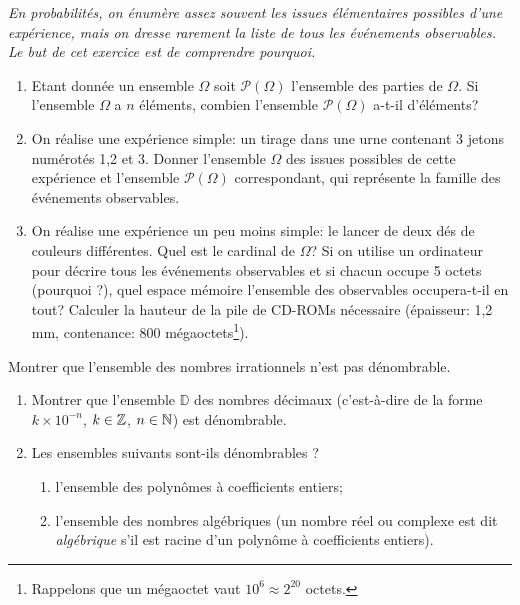 \documentclass[a4paper,12pt,reqno]{amsart}
\begin{document}
\begin{exo} %

  \emph{En probabilités, on énumère assez souvent les issues élémentaires possibles d'une expérience, mais on dresse rarement la liste de tous les événements observables. Le but de cet exercice est de comprendre pourquoi.}

  \begin{enumerate}

    \item Etant donnée un ensemble $\Omega$ soit $\mathcal{P}(\Omega)$ l'ensemble des parties de $\Omega$. Si l'ensemble $\Omega$ a $n$ éléments, combien l'ensemble $\mathcal{P}(\Omega)$ a-t-il d'éléments?

    \item On réalise une expérience simple: un tirage dans une urne contenant 3 jetons numérotés 1,2 et 3.  Donner l'ensemble $\Omega$ des issues possibles de cette expérience et l'ensemble $\mathcal{P}(\Omega)$ correspondant, qui représente la famille des événements observables.

    \item On réalise une expérience un peu moins simple: le lancer de deux dés de couleurs différentes.  Quel est le cardinal de $\Omega$?  Si on utilise un ordinateur pour décrire tous les événements observables et si chacun occupe 5 octets (pourquoi ?), quel espace mémoire l'ensemble des observables occupera-t-il en tout?  Calculer la hauteur de la pile de CD-ROMs nécessaire (épaisseur: 1,2\,mm, contenance: 800 mégaoctets\footnote{Rappelons que un mégaoctet vaut $10^{6} \approx 2^{20}$ octets.}).
  \end{enumerate}
\end{exo}

\begin{exo} %

  Montrer que l'ensemble des nombres irrationnels  n'est pas dénombrable.

\end{exo}

\begin{exo} %

\begin{enumerate}
  \item Montrer que l'ensemble $\mathbb{D}$ des nombres décimaux (c'est-à-dire de la forme $k\times 10^{-n} $, $k\in\mathbb{Z}$, $n\in\mathbb{N}$) est dénombrable.

  \item Les ensembles suivants sont-ils dénombrables ?
  \begin{enumerate}
    \item l'ensemble des polynômes à coefficients entiers;
    \item l'ensemble des nombres algébriques (un nombre réel ou complexe est dit \emph{algébrique} s'il est racine d'un polynôme à coefficients entiers).
  \end{enumerate}
\end{enumerate}

\end{exo}
\end{document}
